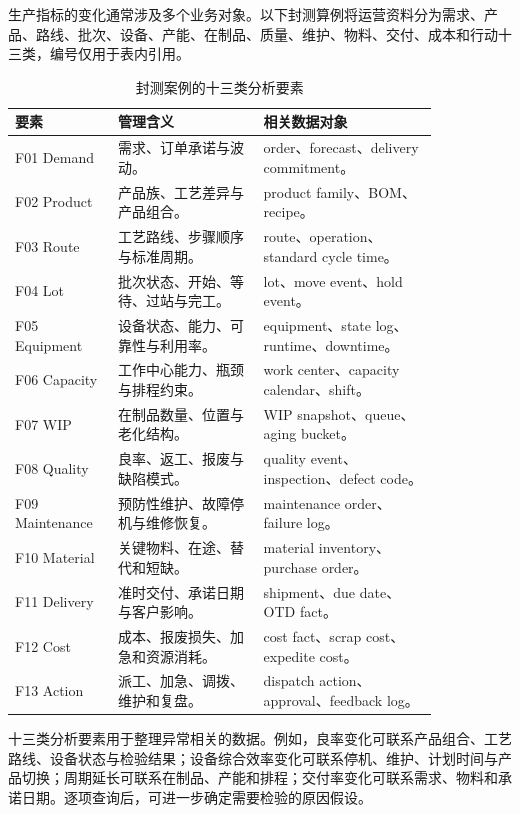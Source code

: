 生产指标的变化通常涉及多个业务对象。以下封测算例将运营资料分为需求、产品、路线、批次、设备、产能、在制品、质量、维护、物料、交付、成本和行动十三类，编号仅用于表内引用。

\begin{table}[htbp]
\centering
\caption{封测案例的十三类分析要素}
\begin{tabular}{P{0.18\linewidth}P{0.30\linewidth}P{0.36\linewidth}}
\toprule
{}
要素 & 管理含义 & 相关数据对象\\
\midrule
F01 Demand & 需求、订单承诺与波动。 & order、forecast、delivery commitment。\\
F02 Product & 产品族、工艺差异与产品组合。 & product family、BOM、recipe。\\
F03 Route & 工艺路线、步骤顺序与标准周期。 & route、operation、standard cycle time。\\
F04 Lot & 批次状态、开始、等待、过站与完工。 & lot、move event、hold event。\\
F05 Equipment & 设备状态、能力、可靠性与利用率。 & equipment、state log、runtime、downtime。\\
F06 Capacity & 工作中心能力、瓶颈与排程约束。 & work center、capacity calendar、shift。\\
F07 WIP & 在制品数量、位置与老化结构。 & WIP snapshot、queue、aging bucket。\\
F08 Quality & 良率、返工、报废与缺陷模式。 & quality event、inspection、defect code。\\
F09 Maintenance & 预防性维护、故障停机与维修恢复。 & maintenance order、failure log。\\
F10 Material & 关键物料、在途、替代和短缺。 & material inventory、purchase order。\\
F11 Delivery & 准时交付、承诺日期与客户影响。 & shipment、due date、OTD fact。\\
F12 Cost & 成本、报废损失、加急和资源消耗。 & cost fact、scrap cost、expedite cost。\\
F13 Action & 派工、加急、调拨、维护和复盘。 & dispatch action、approval、feedback log。\\
\bottomrule
\end{tabular}
\end{table}

十三类分析要素用于整理异常相关的数据。例如，良率变化可联系产品组合、工艺路线、设备状态与检验结果；设备综合效率变化可联系停机、维护、计划时间与产品切换；周期延长可联系在制品、产能和排程；交付率变化可联系需求、物料和承诺日期。逐项查询后，可进一步确定需要检验的原因假设。

